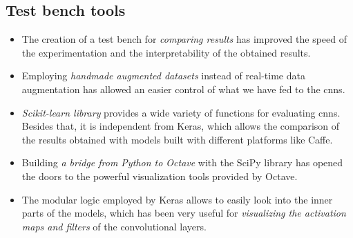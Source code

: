 \subsection*{Test bench tools}
\begin{itemize}
	\item The creation of a test bench for \emph{comparing results} has improved the speed of the experimentation and the interpretability of the obtained results.
	\item Employing \emph{handmade augmented datasets} instead of real-time data augmentation has allowed an easier control of what we have fed to the \glspl{cnn}.
	\item \emph{Scikit-learn library} provides a wide variety of functions for evaluating \glspl{cnn}. Besides that, it is independent from Keras, which allows the comparison of the results obtained with models built with different platforms like Caffe.
	\item Building \emph{a bridge from Python to Octave} with the SciPy library has opened the doors to the powerful visualization tools provided by Octave.
	\item The modular logic employed by Keras allows to easily look into the inner parts of the models, which has been very useful for \emph{visualizing the activation maps and filters} of the convolutional layers.
\end{itemize}

